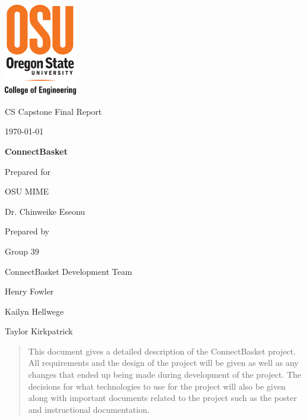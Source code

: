 \documentclass[onecolumn, draftclsnofoot,10pt, compsoc]{IEEEtran}
\def \CapstoneTeamName{		ConnectBasket Development Team}
\def \CapstoneTeamNumber{		39}
\def \GroupMemberOne{			Henry Fowler}
\def \GroupMemberTwo{			Kailyn Hellwege}
\def \GroupMemberThree{			Taylor Kirkpatrick}
\def \CapstoneProjectName{		ConnectBasket}
\def \CapstoneSponsorCompany{	OSU MIME}
\def \CapstoneSponsorPerson{		Dr. Chinweike Eseonu}
\def \DocType{		%
				Final Report
				}
\newcommand{\NameSigPair}[1]{\par
\makebox[2.75in][r]{#1} \hfil 	\makebox[3.25in]{\makebox[2.25in]{\hrulefill} \hfill		\makebox[.75in]{\hrulefill}}
\par\vspace{-12pt} \textit{\tiny\noindent
\makebox[2.75in]{} \hfil		\makebox[3.25in]{\makebox[2.25in][r]{Signature} \hfill	\makebox[.75in][r]{Date}}}}
\renewcommand{\NameSigPair}[1]{#1}
\begin{document}
\begin{titlepage}
    \begin{singlespace}
    	\includegraphics[height=4cm]{coe_v_spot1}
        \hfill 
        \par\vspace{.2in}
        \centering
        \scshape{
            \huge CS Capstone \DocType \par
            {\large\today}\par
            \vspace{.5in}
            \textbf{\Huge\CapstoneProjectName}\par
            \vfill
            {\large Prepared for}\par
            \Huge \CapstoneSponsorCompany\par
            \vspace{5pt}
            {\Large\NameSigPair{\CapstoneSponsorPerson}\par}
            {\large Prepared by }\par
            Group\CapstoneTeamNumber\par
            \CapstoneTeamName\par 
            \vspace{5pt}
            {\Large
                \NameSigPair{\GroupMemberOne}\par
                \NameSigPair{\GroupMemberTwo}\par
                \NameSigPair{\GroupMemberThree}\par
            }
            \vspace{20pt}
        }
        \begin{abstract}
        This document gives a detailed description of the ConnectBasket project. All requirements and the design of the project will be given as well as any changes that ended up being made during development of the project. The decisions for what technologies to use for the project will also be given along with important documents related to the project such as the poster and instructional documentation.

        \end{abstract}     
    \end{singlespace}
\end{titlepage}
\newpage
{}
\tableofcontents
\clearpage
\end{document}
